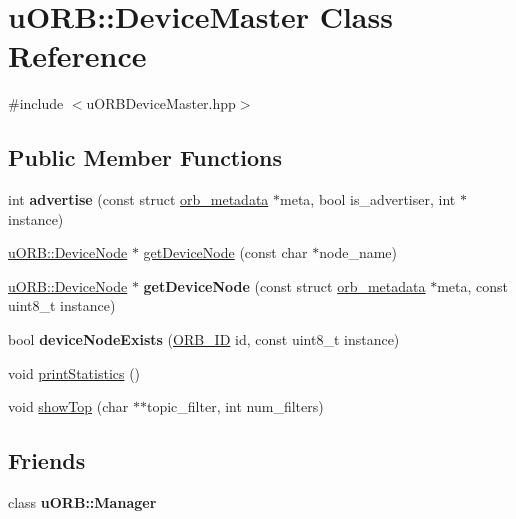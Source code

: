 \hypertarget{classuORB_1_1DeviceMaster}{}\section{u\+O\+RB\+:\+:Device\+Master Class Reference}
\label{classuORB_1_1DeviceMaster}


{\ttfamily \#include $<$u\+O\+R\+B\+Device\+Master.\+hpp$>$}

\subsection*{Public Member Functions}
\begin{DoxyCompactItemize}
\item 
\mbox{\label{classuORB_1_1DeviceMaster_a772af4822d194e3ff6cff97da4635aa1}} 
int {\bfseries advertise} (const struct \hyperlink{structorb__metadata}{orb\+\_\+metadata} $\ast$meta, bool is\+\_\+advertiser, int $\ast$instance)
\item 
\hyperlink{classuORB_1_1DeviceNode}{u\+O\+R\+B\+::\+Device\+Node} $\ast$ \hyperlink{classuORB_1_1DeviceMaster_a793df66a48dcabdd0f5bd8c85beee13c}{get\+Device\+Node} (const char $\ast$node\+\_\+name)
\item 
\mbox{\label{classuORB_1_1DeviceMaster_a2ed78f9b1cded34f77423a014cbe7d8c}} 
\hyperlink{classuORB_1_1DeviceNode}{u\+O\+R\+B\+::\+Device\+Node} $\ast$ {\bfseries get\+Device\+Node} (const struct \hyperlink{structorb__metadata}{orb\+\_\+metadata} $\ast$meta, const uint8\+\_\+t instance)
\item 
\mbox{\label{classuORB_1_1DeviceMaster_a6589533893a7c6095e69a27a25ff48ad}} 
bool {\bfseries device\+Node\+Exists} (\hyperlink{uORB_8h_a96af5434ec1acdf24287bd7851b0413f}{O\+R\+B\+\_\+\+ID} id, const uint8\+\_\+t instance)
\item 
void \hyperlink{classuORB_1_1DeviceMaster_a0a8af69f5ba05738eb173a116acd8daf}{print\+Statistics} ()
\item 
void \hyperlink{classuORB_1_1DeviceMaster_af9f100ed05355fdd8860e27dd8876611}{show\+Top} (char $\ast$$\ast$topic\+\_\+filter, int num\+\_\+filters)
\end{DoxyCompactItemize}
\subsection*{Friends}
\begin{DoxyCompactItemize}
\item 
\mbox{\label{classuORB_1_1DeviceMaster_ac7c1906a5bb7b0e69f9dcffc0c178300}} 
class {\bfseries u\+O\+R\+B\+::\+Manager}
\end{DoxyCompactItemize}


